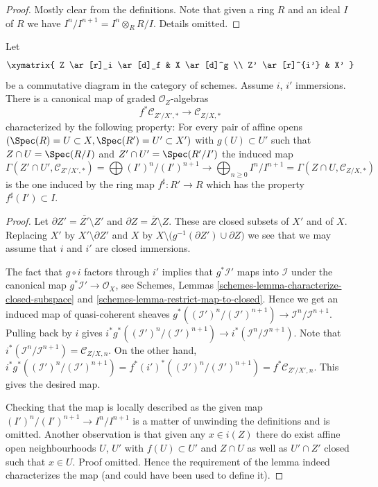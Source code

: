 \begin{proof}
Mostly clear from the definitions. Note that given a ring $R$ and
an ideal $I$ of $R$ we have $I^n/I^{n + 1} = I^n \otimes_R R/I$.
Details omitted.
\end{proof}

\begin{lemma}
\label{lemma-conormal-algebra-functorial}
Let
$$
\xymatrix{
Z \ar[r]_i \ar[d]_f & X \ar[d]^g \\
Z' \ar[r]^{i'} & X'
}
$$
be a commutative diagram in the category of schemes.
Assume $i$, $i'$ immersions. There is a canonical map
of graded $\mathcal{O}_Z$-algebras
$$
f^*\mathcal{C}_{Z'/X', *}
\longrightarrow
\mathcal{C}_{Z/X, *}
$$
characterized by the following property: For every pair of affine opens
$(\Spec(R) = U \subset X, \Spec(R') = U' \subset X')$ with
$g(U) \subset U'$ such that
$Z \cap U = \Spec(R/I)$ and $Z' \cap U' = \Spec(R'/I')$
the induced map
$$
\Gamma(Z' \cap U', \mathcal{C}_{Z'/X', *}) =
\bigoplus\nolimits (I')^n/(I')^{n + 1}
\longrightarrow
\bigoplus\nolimits_{n \geq 0} I^n/I^{n + 1} =
\Gamma(Z \cap U, \mathcal{C}_{Z/X, *})
$$
is the one induced by the ring map $f^\sharp : R' \to R$ which
has the property $f^\sharp(I') \subset I$.
\end{lemma}

\begin{proof}
Let $\partial Z' = \overline{Z'} \setminus Z'$ and
$\partial Z = \overline{Z} \setminus Z$. These are closed subsets of $X'$ and
of $X$. Replacing $X'$ by $X' \setminus \partial Z'$ and $X$ by
$X \setminus \big(g^{-1}(\partial Z') \cup \partial Z\big)$ we
see that we may assume that $i$ and $i'$ are closed immersions.

\medskip\noindent
The fact that $g \circ i$ factors through $i'$ implies that
$g^*\mathcal{I}'$ maps into $\mathcal{I}$ under the canonical
map $g^*\mathcal{I}' \to \mathcal{O}_X$, see
Schemes, Lemmas
\ref{schemes-lemma-characterize-closed-subspace} and
\ref{schemes-lemma-restrict-map-to-closed}.
Hence we get an induced map of quasi-coherent sheaves
$g^*((\mathcal{I}')^n/(\mathcal{I}')^{n + 1}) \to
\mathcal{I}^n/\mathcal{I}^{n + 1}$.
Pulling back by $i$ gives
$i^*g^*((\mathcal{I}')^n/(\mathcal{I}')^{n + 1}) \to
i^*(\mathcal{I}^n/\mathcal{I}^{n + 1})$.
Note that
$i^*(\mathcal{I}^n/\mathcal{I}^{n + 1}) = \mathcal{C}_{Z/X, n}$.
On the other hand,
$i^*g^*((\mathcal{I}')^n/(\mathcal{I}')^{n + 1}) =
f^*(i')^*((\mathcal{I}')^n/(\mathcal{I}')^{n + 1}) =
f^*\mathcal{C}_{Z'/X', n}$.
This gives the desired map.

\medskip\noindent
Checking that the map is locally described as the given map
$(I')^n/(I')^{n + 1} \to I^n/I^{n + 1}$ is a matter of unwinding the
definitions and is omitted. Another observation is that given any
$x \in i(Z)$ there do exist affine open neighbourhoods $U$, $U'$
with $f(U) \subset U'$ and $Z \cap U$ as well as $U' \cap Z'$
closed such that $x \in U$. Proof omitted. Hence the requirement
of the lemma indeed characterizes the map (and could have been used
to define it).
\end{proof}

